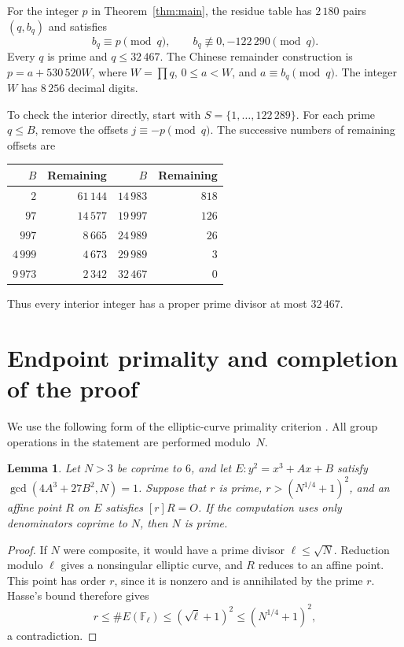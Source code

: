 \documentclass[11pt]{amsart}
\newtheorem{lemma}[theorem]{Lemma}
\theoremstyle{definition}
\begin{document}
For the integer $p$ in Theorem~\ref{thm:main}, the residue table has
$2\,180$ pairs $(q,b_q)$ and satisfies
\[
 b_q\equiv p\pmod q,\qquad b_q\not\equiv0,-122\,290\pmod q.
\]
Every $q$ is prime and $q\le32\,467$. The Chinese remainder construction is
$p=a+530\,520W$, where $W=\prod q$, $0\le a<W$, and
$a\equiv b_q\pmod q$. The integer $W$ has $8\,256$ decimal digits.

To check the interior directly, start with $S=\{1,\ldots,122\,289\}$. For each prime
$q\le B$, remove the offsets $j\equiv-p\pmod q$. The successive numbers
of remaining offsets are
\begin{center}
\begin{tabular}{r r@{\qquad}r r}
\toprule
$B$ & Remaining & $B$ & Remaining\\
\midrule
$2$ & $61\,144$ & $14\,983$ & $818$\\
$97$ & $14\,577$ & $19\,997$ & $126$\\
$997$ & $8\,665$ & $24\,989$ & $26$\\
$4\,999$ & $4\,673$ & $29\,989$ & $3$\\
$9\,973$ & $2\,342$ & $32\,467$ & $0$\\
\bottomrule
\end{tabular}
\end{center}
Thus every interior integer has a proper prime divisor at most $32\,467$.

\section{Endpoint primality and completion of the proof}
We use the following form of the elliptic-curve primality criterion
\cite{atkinmorain}. All group operations in the statement are performed
modulo~$N$.

\begin{lemma}\label{lem:ecpp}
Let $N>3$ be coprime to $6$, and let
$E:y^2=x^3+Ax+B$ satisfy $\gcd(4A^3+27B^2,N)=1$.
Suppose that $r$ is prime, $r>(N^{1/4}+1)^2$, and an affine point $R$ on $E$
satisfies $[r]R=O$. If the computation uses only denominators coprime to $N$,
then $N$ is prime.
\end{lemma}
\begin{proof}
If $N$ were composite, it would have a prime divisor $\ell\le\sqrt N$.
Reduction modulo $\ell$ gives a nonsingular elliptic curve, and $R$ reduces
to an affine point. This point has order $r$, since it is nonzero and is
annihilated by the prime $r$. Hasse's bound therefore gives
\[
 r\le\#E(\mathbb F_\ell)
 \le(\sqrt\ell+1)^2
 \le(N^{1/4}+1)^2,
\]
a contradiction.
\end{proof}
\end{document}
